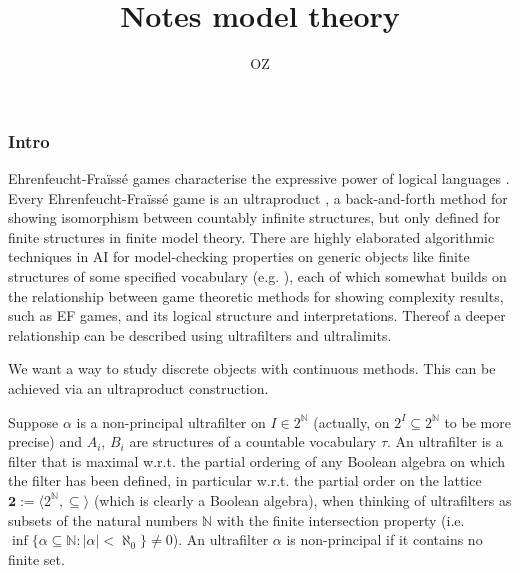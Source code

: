 
%

\title{Notes model theory}
\author{OZ}



\maketitle
%
\subsubsection*{Intro}
Ehrenfeucht-Fra\"iss\'e games characterise the expressive power of logical languages \cite{ams}. Every Ehrenfeucht-Fra\"iss\'e game is an ultraproduct \cite{models}, a back-and-forth method for showing isomorphism between countably infinite structures, but only defined for finite structures in finite model theory. There are highly elaborated algorithmic techniques in AI for model-checking properties on generic objects like finite structures of some specified vocabulary (e.g. \cite{Carrillo}), each of which somewhat builds on the relationship between game theoretic methods for showing complexity results, such as EF games, and its logical structure and interpretations. Thereof a deeper relationship can be described using ultrafilters and ultralimits. 


We want a way to study discrete objects with continuous methods. This can be achieved via an ultraproduct construction. 

Suppose $\alpha$ is a non-principal ultrafilter on $I\in 2^{\mathbb{N}}$ (actually, on $2^I\subseteq 2^\mathbb{N}$ to be more precise) and $A_i$, $B_i$ are structures of a countable vocabulary $\tau$. An ultrafilter is a filter that is maximal w.r.t. the partial ordering of any Boolean algebra on which the filter has been defined, in particular w.r.t. the partial order on the lattice $\mathbf{2} := \langle 2^{\mathbb{N}}, \subseteq\rangle$ (which is clearly a Boolean algebra), when thinking of ultrafilters as subsets of the natural numbers $\mathbb{N}$ with the finite intersection property (i.e. $\inf\{\alpha\subseteq\mathbb{N}: |\alpha|<\aleph_0\} \neq 0$). An ultrafilter $\alpha$ is non-principal if it contains no finite set. 
 
